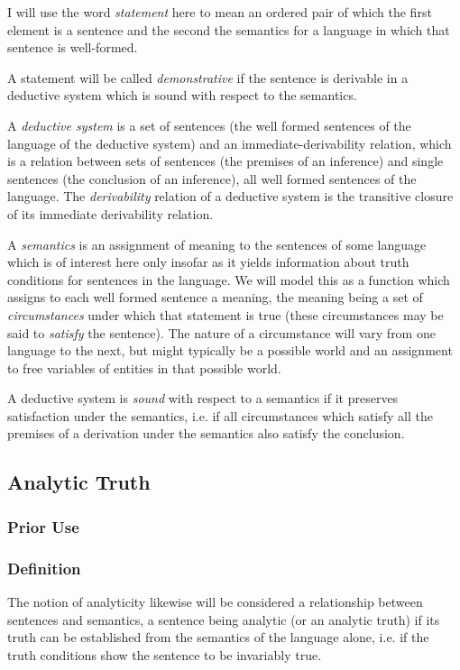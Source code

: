 \documentclass[numreferences]{rbjk}
\begin{document}
\begin{article}
I will use the word {\it statement} here to mean an ordered pair of which the first element is a sentence and the second the semantics for a language in which that sentence is well-formed.

A statement will be called {\it demonstrative} if the sentence is derivable in a deductive system which is sound with respect to the semantics.

A {\it deductive system} is a set of sentences (the well formed sentences of the language of the deductive system) and an immediate-derivability relation, which is a relation between sets of sentences (the premises of an inference) and single sentences (the conclusion of an inference), all well formed sentences of the language.
The {\it derivability} relation of a deductive system is the transitive closure of its immediate derivability relation.

A {\it semantics} is an assignment of meaning to the sentences of some language which is of interest here only insofar as it yields information about truth conditions for sentences in the language.
We will model this as a function which assigns to each well formed sentence a meaning, the meaning being a set of {\it circumstances} under which that statement is true (these circumstances may be said to {\it satisfy} the sentence).
The nature of a circumstance will vary from one language to the next, but might typically be a possible world and an assignment to free variables of entities in that possible world.

A deductive system is {\it sound} with respect to a semantics if it preserves satisfaction under the semantics, i.e. if all circumstances which satisfy all the premises of a derivation under the semantics also satisfy the conclusion.

\subsection{Analytic Truth}

\subsubsection{Prior Use}

\subsubsection{Definition}

The notion of analyticity likewise will be considered a relationship between sentences and semantics, a sentence being analytic (or an analytic truth) if its truth can be established from the semantics of the language alone, i.e. if the truth conditions show the sentence to be invariably true.


\end{article}
\end{document}
